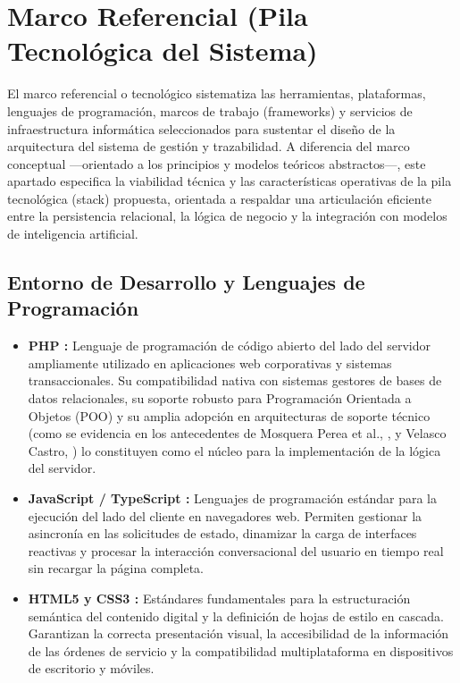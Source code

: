 \section{Marco Referencial (Pila Tecnológica del Sistema)}

El marco referencial o tecnológico sistematiza las herramientas, plataformas, lenguajes de programación, marcos de trabajo (frameworks) y servicios de infraestructura informática seleccionados para sustentar el diseño de la arquitectura del sistema de gestión y trazabilidad. A diferencia del marco conceptual ---orientado a los principios y modelos teóricos abstractos---, este apartado especifica la viabilidad técnica y las características operativas de la pila tecnológica (stack) propuesta, orientada a respaldar una articulación eficiente entre la persistencia relacional, la lógica de negocio y la integración con modelos de inteligencia artificial.

\subsection{Entorno de Desarrollo y Lenguajes de Programación}

\begin{itemize}
    \item \textbf{PHP \cite{php2024}:} Lenguaje de programación de código abierto del lado del servidor ampliamente utilizado en aplicaciones web corporativas y sistemas transaccionales. Su compatibilidad nativa con sistemas gestores de bases de datos relacionales, su soporte robusto para Programación Orientada a Objetos (POO) y su amplia adopción en arquitecturas de soporte técnico (como se evidencia en los antecedentes de Mosquera Perea et al., \cite{mosquera2025}, y Velasco Castro, \cite{velasco2023}) lo constituyen como el núcleo para la implementación de la lógica del servidor.
    \item \textbf{JavaScript / TypeScript \cite{ecma2023}:} Lenguajes de programación estándar para la ejecución del lado del cliente en navegadores web. Permiten gestionar la asincronía en las solicitudes de estado, dinamizar la carga de interfaces reactivas y procesar la interacción conversacional del usuario en tiempo real sin recargar la página completa.
    \item \textbf{HTML5 y CSS3 \cite{w3c2023}:} Estándares fundamentales para la estructuración semántica del contenido digital y la definición de hojas de estilo en cascada. Garantizan la correcta presentación visual, la accesibilidad de la información de las órdenes de servicio y la compatibilidad multiplataforma en dispositivos de escritorio y móviles.
\end{itemize}

